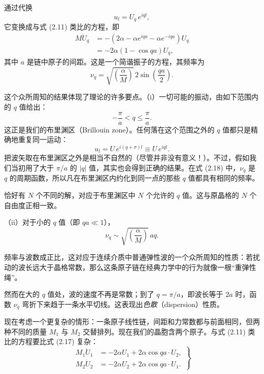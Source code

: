 通过代换
\begin{equation*}
u_{l} = U_{q}\, e^{iql},
\tag{2.16}
\end{equation*}
它变换成与式 (2.11) 类比的方程，即
\begin{align*}
M \ddot{U}_{q} &= - \left( 2\alpha - \alpha e^{iqa} - \alpha e^{-iqa} \right) U_{q} \\
&= - 2\alpha \left( 1 - \cos qa \right) U_{q},
\tag{2.17}
\end{align*}
其中 $a$ 是链中原子的间距。这是一个简谐振子的方程，其频率为
\begin{equation*}
\nu_{q} = \sqrt{\left( \frac{\alpha}{M} \right)}\, 2 \sin \left( \frac{qa}{2} \right).
\tag{2.18}
\end{equation*}

这个众所周知的结果体现了理论的许多要点。（i）一切可能的振动，由如下范围内的 $q$ 值给出：
\begin{equation*}
- \frac{\pi}{a} < q \leqslant \frac{\pi}{a}.
\tag{2.19}
\end{equation*}
这正是我们的布里渊区（Brillouin zone）。任何落在这个范围之外的 $q$ 值都只是精确地重复同一运动：
\begin{equation*}
u_{l} = U\, e^{i(q+\sigma)l} \equiv U\, e^{iql}.
\tag{2.20}
\end{equation*}
把波矢取在布里渊区之外是相当不自然的（尽管并非没有意义！）。不过，假如我们当初用了大于 $\pi/a$ 的 $|q|$ 值，其实也会得到正确的结果。在式 (2.18) 中，$\nu_q$ 是 $q$ 的周期函数，所以凡在布里渊区内约化到同一点的那些 $q$ 值都具有相同的频率。

恰好有 $N$ 个不同的解，对应于布里渊区中 $N$ 个允许的 $q$ 值。这与原晶格的 $N$ 个自由度正相一致。

（ii）对于小的 $q$ 值（即 $qa \ll 1$），
\begin{equation*}
\nu_{q} \sim \sqrt{\left( \frac{\alpha}{M} \right)}\, aq.
\tag{2.21}
\end{equation*}

频率与波数成正比，这对应于连续介质中普通弹性波的一个众所周知的性质：若扰动的波长远大于晶格常数，那么这条原子链在经典力学中的行为就像一根“重弹性绳”。

然而在大的 $q$ 值处，波的速度不再是常数；到了 $q = \pi/a$，即波长等于 $2a$ 时，函数 $\nu_q$ 弯折下来趋于一条水平切线。这表现出\emph{色散}（dispersion）性质。

现在考虑一个更复杂的情形：一条原子线性链，间距和力常数都与前面相同，但两种不同的质量 $M_1$ 与 $M_2$ 交替排列。现在我们的晶胞含两个原子。与式 (2.11) 类比的方程要比式 (2.17) 复杂：
\begin{equation*}
\left.
\begin{aligned}
M_1 \ddot{U}_{1} &= - 2\alpha U_{1} + 2\alpha \cos qa \cdot U_{2}, \\
M_2 \ddot{U}_{2} &= - 2\alpha U_{2} + 2\alpha \cos qa \cdot U_{1}.
\end{aligned}
\right\}
\tag{2.22}
\end{equation*}

